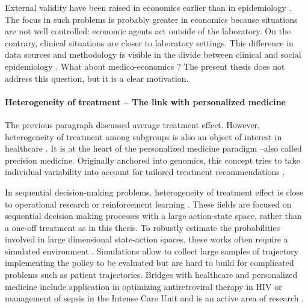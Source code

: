 \documentclass[french,12pt,twoside,a4paper]{book}
\begin{document}
\begin{background_box_left}
  External validity have been raised in economics earlier than in epidemiology
  \citep{deaton2020randomization}. The focus in such problems is probably
  greater in economics because situations are not well controlled: economic
  agents act outside of the laboratory. On the contrary, clinical situations are
  closer to laboratory settings. This difference in data sources and methodology
  is visible in the divide between clinical and social epidemiology
  \citep{zielhuis2001social}. What about medico-economics ? The present thesis
  does not address this question, but it is a clear
  motivation.

  \paragraph{Heterogeneity of treatment -- The link with personalized medicine}

  The previous paragraph discussed average treatment effect. However,
  heterogeneity of treatment among subgroups is also an object of interest in
  healthcare \citep{hernan2020causal}. It is at the heart of the personalized
  medicine paradigm --also called precision medicine. Originally anchored into
  genomics, this concept tries to take individual variability into account for
  tailored treatment recommendations \citep{schork2015personalized,
    topol2019high}.

  In sequential decision-making problems, heterogeneity of treatment effect is
  close to operational research \citep{schaefer2004modeling} or reinforcement
  learning \citep{bareinboim2015bandits}. These fields are focused on sequential
  decision making processes with a large action-state space, rather than a
  one-off treatment as in this thesis. To robustly estimate the probabilities
  involved in large dimensional state-action spaces, these works often require a
  simulated environment \citep{bennett2013artificial}. Simulations allow to
  collect large samples of trajectory implementing the policy to be evaluated
  but are hard to build for complicated problems such as patient trajectories.
  Bridges with healthcare and personalized medicine include application in
  optimizing antiretroviral therapy in HIV \citep{guez2008adaptive} or
  management of sepsis in the Intense Care Unit \citep{komorowski2018artificial}
  and is an active area of research \citep{coronato2020reinforcement}.

\end{background_box_left}
\end{document}
